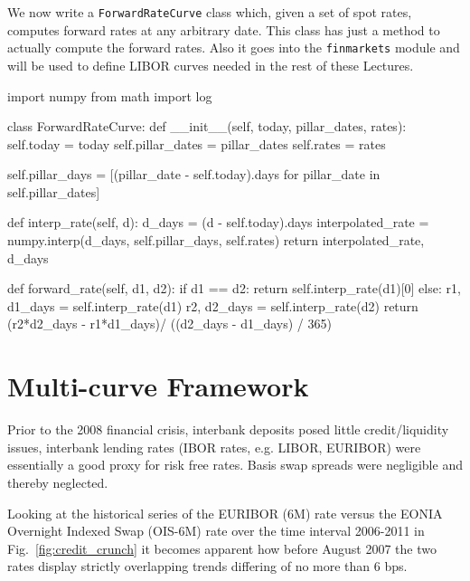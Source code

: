 \begin{finmarkets}
We now write a \texttt{ForwardRateCurve} class which, given a set of spot rates, computes forward rates at any arbitrary date. This class has just a method to actually compute the forward rates. Also it goes into the \texttt{finmarkets} module and will be used to define LIBOR curves needed in the rest of these Lectures.
\end{finmarkets}

\begin{ipython}
import numpy
from math import log

class ForwardRateCurve:
    def __init__(self, today, pillar_dates, rates):
        self.today = today
        self.pillar_dates = pillar_dates
        self.rates = rates

        self.pillar_days = [(pillar_date - self.today).days
            for pillar_date in self.pillar_dates]        

    def interp_rate(self, d):
        d_days = (d - self.today).days
        interpolated_rate = numpy.interp(d_days, self.pillar_days, self.rates)
        return interpolated_rate, d_days 

    def forward_rate(self, d1, d2):
        if d1 == d2:
            return self.interp_rate(d1)[0]
        else:
            r1, d1_days = self.interp_rate(d1)
            r2, d2_days = self.interp_rate(d2)
            return (r2*d2_days - r1*d1_days)/ ((d2_days - d1_days) / 365)
\end{ipython}

\section{Multi-curve Framework}
\label{sec:financial-crisis}

Prior to the 2008 financial crisis, interbank deposits posed little credit/liquidity issues, interbank lending rates (IBOR rates, e.g. LIBOR, EURIBOR) were essentially a good proxy for risk free rates. Basis swap spreads were negligible and thereby neglected. 

Looking at the historical series of the EURIBOR (6M) rate versus the EONIA Overnight Indexed Swap (OIS-6M) rate over the time interval 2006-2011 in Fig.~\ref{fig:credit_crunch} it becomes apparent how before August 2007 the two rates display strictly overlapping trends differing of no more than 6 bps.

